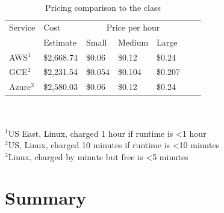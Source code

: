 \documentclass{sig-alternate}
\begin{document}

\begin{table}[h!]
\caption{Pricing comparison to the class}\label{T:tab2}
\begin{small}
\begin{tabular}{l|l|l|l|l|l|p{2cm}|}
Service & Cost & \multicolumn{3}{|c|}{Price per hour} \\
  & Estimate &  Small& Medium& Large \\
 \hline
AWS$^1$ & \$2,668.74  & \$0.06 & \$0.12 & \$0.24 \\
GCE$^2$ & \$2,231.54  & \$0.054 & \$0.104 & \$0.207 \\
Azure$^3$ & \$2,580.03  & \$0.06 & \$0.12 & \$0.24 \\ 
\end{tabular}
\\
\\
$^1$US East, Linux, charged 1 hour if runtime is <1 hour\\
$^2$US, Linux, charged 10 minutes if runtime is <10 minutes\\
$^3$Linux, charged by minute but free is <5 minutes\\
\end{small}
\end{table}


\section{Summary}


\end{document}
